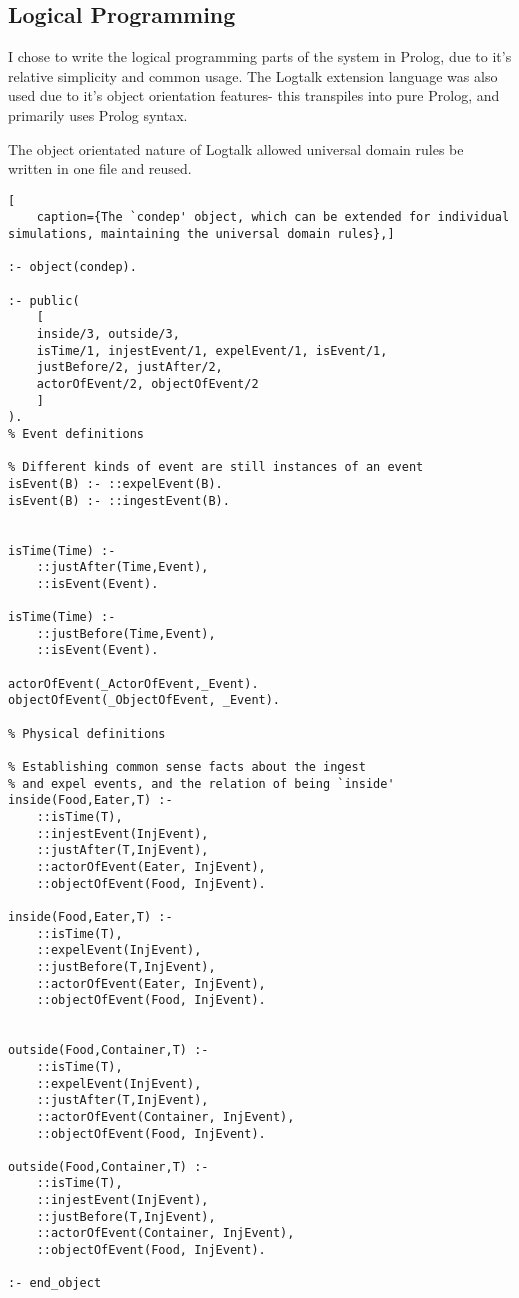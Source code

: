 \documentclass[report]{subfiles}
\begin{document}
\subsection{Logical Programming}
I chose to write the logical programming parts of the system in Prolog, due to it's relative simplicity and common usage. The Logtalk extension language was also used due to it's object orientation features- this transpiles into pure Prolog, and primarily uses Prolog syntax.

The object orientated nature of Logtalk allowed universal domain rules be written in one file and reused. 



\begin{lstlisting}[
    caption={The `condep' object, which can be extended for individual simulations, maintaining the universal domain rules},]

:- object(condep).

:- public(
    [
    inside/3, outside/3,
    isTime/1, injestEvent/1, expelEvent/1, isEvent/1,
    justBefore/2, justAfter/2,
    actorOfEvent/2, objectOfEvent/2
    ]
).
% Event definitions

% Different kinds of event are still instances of an event
isEvent(B) :- ::expelEvent(B).
isEvent(B) :- ::ingestEvent(B).


isTime(Time) :-
    ::justAfter(Time,Event),
    ::isEvent(Event).

isTime(Time) :-
    ::justBefore(Time,Event),
    ::isEvent(Event).

actorOfEvent(_ActorOfEvent,_Event).
objectOfEvent(_ObjectOfEvent, _Event).

% Physical definitions

% Establishing common sense facts about the ingest
% and expel events, and the relation of being `inside'
inside(Food,Eater,T) :-
    ::isTime(T),
    ::injestEvent(InjEvent),
    ::justAfter(T,InjEvent),
    ::actorOfEvent(Eater, InjEvent),
    ::objectOfEvent(Food, InjEvent).

inside(Food,Eater,T) :-
    ::isTime(T),
    ::expelEvent(InjEvent),
    ::justBefore(T,InjEvent),
    ::actorOfEvent(Eater, InjEvent),
    ::objectOfEvent(Food, InjEvent).


outside(Food,Container,T) :-
    ::isTime(T),
    ::expelEvent(InjEvent),
    ::justAfter(T,InjEvent),
    ::actorOfEvent(Container, InjEvent),
    ::objectOfEvent(Food, InjEvent).

outside(Food,Container,T) :-
    ::isTime(T),
    ::injestEvent(InjEvent),
    ::justBefore(T,InjEvent),
    ::actorOfEvent(Container, InjEvent),
    ::objectOfEvent(Food, InjEvent).

:- end_object
    
\end{lstlisting}
\end{document}
